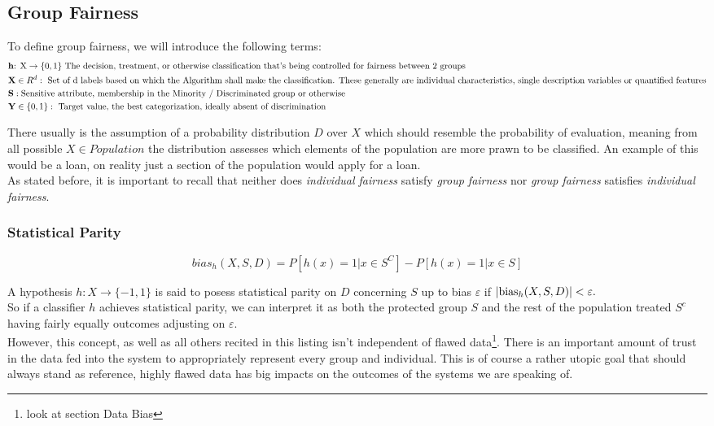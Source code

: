 \subsection{Group Fairness}
To define group fairness, we will introduce the following terms:
\begin{align*}
  &\textup{\textbf{h}: X} \to \{ 0,1\} \textup{ The decision, treatment, or otherwise classification that's being controlled for fairness between 2 groups} \\
  &\textbf{X} \in R^d:\textup{ Set of d labels based on which the Algorithm shall make the classification. These generally are individual characteristics, single description variables or quantified features} \\
  &\textbf{S}: \textup{Sensitive attribute, membership in the Minority / Discriminated group or otherwise} \\
  & \textbf{Y}\in \{ 0,1\} :\textup{ Target value, the best categorization, ideally absent of discrimination}
\end{align*}

 There usually is the assumption of a probability distribution $D$ over $X$ which should resemble the probability of evaluation, meaning from all possible $ X \in Population$ the distribution assesses which elements of the population are more prawn to be classified. An example of this would be a loan, on reality just a section of the population would apply for a loan. \\

As stated before, it is important to recall that neither does \textsl{individual fairness} satisfy \textsl{group fairness} nor \textsl{group fairness}  satisfies \textsl{individual fairness}.

\subsubsection{Statistical Parity}
\[bias_h(X,S,D) = P[h(x) = 1|x \in S^C] - P[h(x) = 1|x \in S] \]

A hypothesis $ h:X \to \{-1,1\}$ is said to posess statistical parity on $D$ concerning $S$ up to bias $\varepsilon$ if $|\textup{bias}_h(X,S,D)| < \varepsilon.$ \cite{Math15b}\\
So if a classifier $h$ achieves statistical parity, we can interpret it as both the protected group $S$ and the rest of the population treated $S^c$ having fairly equally outcomes adjusting on $\varepsilon$.\\ However, this concept, as well as all others recited in this listing isn't independent of flawed data\footnote{look at section Data Bias}. There is an important amount of trust in the data fed into the system to appropriately represent every group and individual. This is of course a rather utopic goal that should always stand as reference, highly flawed data has big impacts on the outcomes of the systems we are speaking of.



